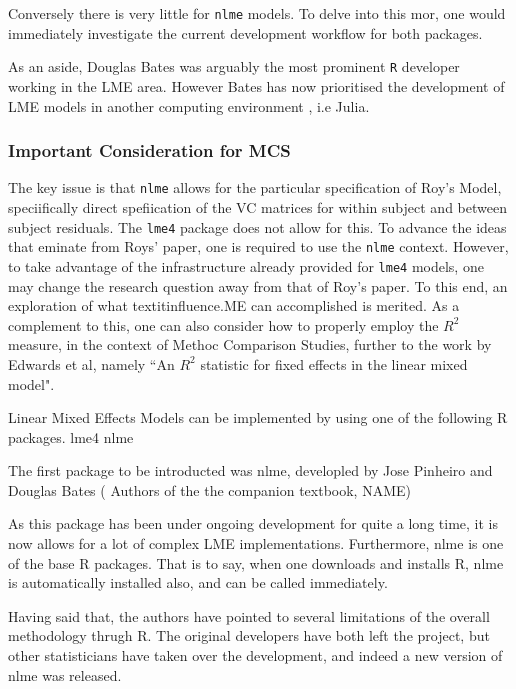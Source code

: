 Conversely there is very little for \texttt{nlme} models. To delve into this mor, one would immediately investigate the current development workflow for both packages.

As an aside, Douglas Bates was arguably the most prominent \texttt{R} developer working in the LME area. 
However Bates has now prioritised the development of LME models in another computing environment , i.e Julia. 


\subsubsection*{Important Consideration for MCS}

The key issue is that \texttt{nlme} allows for the particular specification of Roy's Model, speciifically direct spefiication of the VC matrices for within subject and between subject residuals.
The \texttt{lme4} package does not allow for this.
To advance the ideas that eminate from Roys' paper, one is required to use the \texttt{nlme} context. However, to take advantage of the infrastructure already provided for \texttt{lme4} models, one may change the research question away from that of Roy's paper. 
To this end, an exploration of what textit{influence.ME} can accomplished is merited.
As a complement to this, one can also consider how to properly employ the $R^2$ measure, in the context of Methoc Comparison Studies, further to the work by Edwards et al, namely ``An $R^2$ statistic for fixed effects in the linear mixed model".
\newpage

	Linear Mixed Effects Models can be implemented by using one of the following R packages.
	lme4
	nlme
	
	The first package to be introducted was nlme, developled by Jose Pinheiro and Douglas Bates ( Authors of the the companion textbook, NAME)
	
	As this package has been under ongoing development for quite a long time, it is now allows for a lot of complex LME implementations. 
	Furthermore, nlme is one of the base R packages.  That is to say, when one downloads and installs R, nlme is automatically installed also, and can be called immediately.
	
	Having said that, the authors have pointed to several limitations of the overall methodology thrugh R.
	The original developers have both left the project, but other statisticians have taken over the development, and indeed a new version of nlme was released.
	
